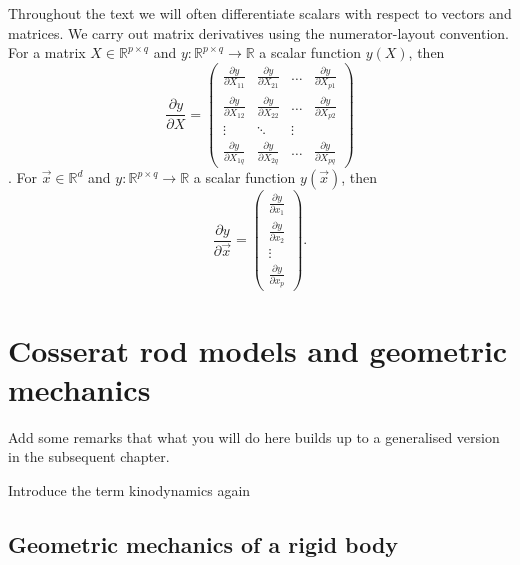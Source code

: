 Throughout the text we will often differentiate scalars with respect to vectors and matrices. We carry out matrix derivatives using the numerator-layout convention. For a matrix $X \in \mathbb{R}^{p \times q}$ and $y : \mathbb{R}^{p \times q} \to \mathbb{R}$ a scalar function $y(X)$, then
\begin{equation} \label{eq:numerator-layout convention}
	\frac{\partial y}{\partial X} = \begin{pmatrix}
		\frac{\partial y}{\partial X_{11}} & \frac{\partial y}{\partial X_{21}} & \dots & \frac{\partial y}{\partial X_{p1}} \\
		\frac{\partial y}{\partial X_{12}} & \frac{\partial y}{\partial X_{22}} & \dots & \frac{\partial y}{\partial X_{p2}} \\
		 \vdots & \ddots & \vdots \\
		 \frac{\partial y}{\partial X_{1q}} & \frac{\partial y}{\partial X_{2q}} & \dots & \frac{\partial y}{\partial X_{pq}}
	\end{pmatrix}
\end{equation}.
For $\vec{x} \in \mathbb{R}^d$ and $y : \mathbb{R}^{p \times q} \to \mathbb{R}$ a scalar function $y(\vec{x})$, then
\begin{equation}
	\frac{\partial y}{\partial \vec{x}} = \begin{pmatrix}
		\frac{\partial y}{\partial x_1} \\
		\frac{\partial y}{\partial x_2} \\
		\vdots \\
		\frac{\partial y}{\partial x_p}
	\end{pmatrix}.
\end{equation}


\chapter{Cosserat rod models and geometric mechanics} \label{ch:Cosserat rods}

{ \color{red} Add some remarks that what you will do here builds up to a generalised version in the subsequent chapter. 

Introduce the term kinodynamics again} 



\section{Geometric mechanics of a rigid body} \label{sec:Introduction - rigid body}

